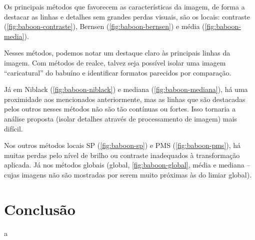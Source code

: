 \documentclass[brazilian,a4paper,twocolumn]{article}
\begin{document}
        Os principais métodos que favorecem as características da imagem, de forma a destacar as linhas e detalhes sem grandes perdas visuais, são os locais: contraste (\cref{fig:baboon-contraste}), Bernsen (\cref{fig:baboon-bernsen}) e média (\cref{fig:baboon-media}).

        Nesses métodos, podemos notar um destaque claro às principais linhas da imagem. Com métodos de realce, talvez seja possível isolar uma imagem ``caricatural'' do babuíno e identificar formatos parecidos por comparação.

        Já em Niblack (\cref{fig:baboon-niblack}) e mediana (\cref{fig:baboon-mediana}), há uma proximidade aos mencionados anteriormente, mas as linhas que são destacadas pelos outros nesses métodos não são tão contínuas ou fortes. Isso tornaria a análise proposta (isolar detalhes através de processamento de imagem) mais difícil.

        Nos outros métodos locais SP (\cref{fig:baboon-sp}) e PMS (\cref{fig:baboon-pms}), há muitas perdas pelo nível de brilho ou contraste inadequados à transformação aplicada. Já nos métodos globais (global, \cref{fig:baboon-global}, média e mediana -- cujas imagens não são mostradas por serem muito próximas às do limiar global).

\section{Conclusão}

    a
\end{document}
